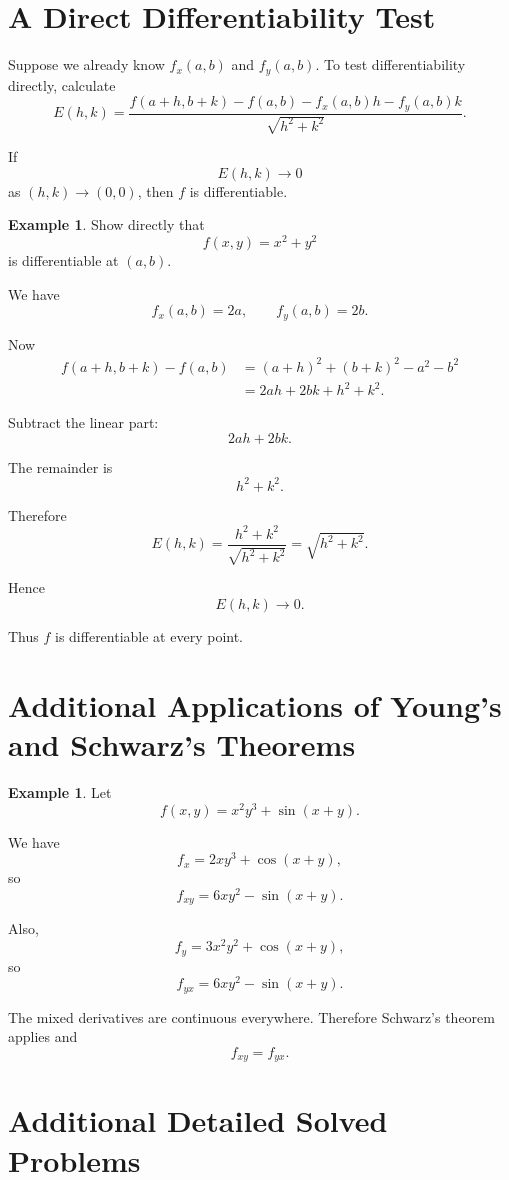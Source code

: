 \documentclass[11pt,oneside]{book}
\theoremstyle{studentthm}
\theoremstyle{definition}
\newtheorem{example}[theorem]{Example}
\begin{document}
\section{A Direct Differentiability Test}

Suppose we already know \(f_x(a,b)\) and \(f_y(a,b)\). To test
differentiability directly, calculate
\[
E(h,k)
=
\frac{
f(a+h,b+k)-f(a,b)
-f_x(a,b)h
-f_y(a,b)k
}{
\sqrt{h^2+k^2}
}.
\]

If
\[
E(h,k)\to0
\]
as \((h,k)\to(0,0)\), then \(f\) is differentiable.

\begin{example}
Show directly that
\[
f(x,y)=x^2+y^2
\]
is differentiable at \((a,b)\).

We have
\[
f_x(a,b)=2a,
\qquad
f_y(a,b)=2b.
\]

Now
\[
\begin{aligned}
f(a+h,b+k)-f(a,b)
&=
(a+h)^2+(b+k)^2-a^2-b^2\\
&=
2ah+2bk+h^2+k^2.
\end{aligned}
\]

Subtract the linear part:
\[
2ah+2bk.
\]

The remainder is
\[
h^2+k^2.
\]

Therefore
\[
E(h,k)
=
\frac{h^2+k^2}{\sqrt{h^2+k^2}}
=
\sqrt{h^2+k^2}.
\]

Hence
\[
E(h,k)\to0.
\]

Thus \(f\) is differentiable at every point.
\end{example}

\section{Additional Applications of Young's and Schwarz's Theorems}

\begin{example}
Let
\[
f(x,y)=x^2y^3+\sin(x+y).
\]

We have
\[
f_x=2xy^3+\cos(x+y),
\]
so
\[
f_{xy}
=
6xy^2-\sin(x+y).
\]

Also,
\[
f_y=3x^2y^2+\cos(x+y),
\]
so
\[
f_{yx}
=
6xy^2-\sin(x+y).
\]

The mixed derivatives are continuous everywhere. Therefore Schwarz's
theorem applies and
\[
f_{xy}=f_{yx}.
\]
\end{example}

\section{Additional Detailed Solved Problems}
\end{document}
